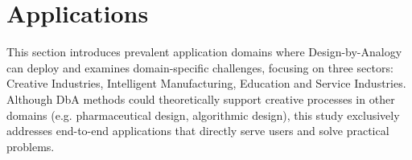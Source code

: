 \section{Applications}
This section introduces prevalent application domains where Design-by-Analogy can deploy and examines domain-specific challenges, focusing on three sectors: Creative Industries, Intelligent Manufacturing, Education and Service Industries. Although DbA methods could theoretically support creative processes in other domains (e.g. pharmaceutical design, algorithmic design), this study exclusively addresses end-to-end applications that directly serve users and solve practical problems.

